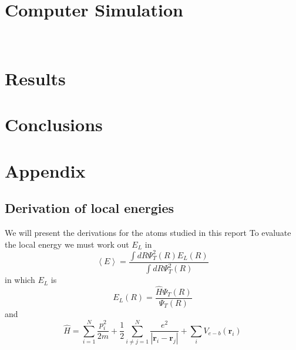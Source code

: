 \documentclass{article}
\begin{document}

 

\section{Computer Simulation}
\


\section{Results}


\section{Conclusions}


{}





\section{Appendix}
\subsection{Derivation of local energies}
We will present the derivations for the atoms studied in this report
To evaluate the local energy we must work out $E_L$ in 
\begin{equation}
 \left\langle E \right\rangle = \frac{\int dR \Psi_T^2(R)E_L(R)}{\int dR \Psi_T^2(R)}
\end{equation}
in which $E_L$ is
\begin{equation}
 E_L(R)=\frac{\hat{H}\Psi_T(R)}{\Psi_T(R)}
\end{equation}
and
\begin{equation}
 \hat{H}=\sum_{i=1}^N \frac{p_i^2}{2m}+\frac12 \sum_{i\ne j=1}^N \frac{e^2}{\left| \mathbf{r}_i -\mathbf{r}_j \right|}+\sum_i V_{e-b}(\mathbf{r}_i)
\end{equation}
\end{document}

